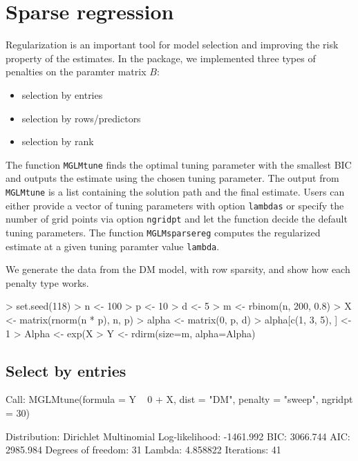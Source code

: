 \documentclass[a4paper]{article}
\begin{document}
\section{Sparse regression}

Regularization is an important tool for model selection and improving the risk property of the estimates.  In the package, we implemented three types of penalties on the paramter matrix $B$:
\begin{itemize}
\item selection by entries
\item selection by rows/predictors
\item selection by rank
\end{itemize}

The function {\tt MGLMtune} finds the optimal tuning parameter with the smallest BIC and outputs the estimate using the chosen tuning parameter.  The output from {\tt MGLMtune} is a list containing the solution path and the final estimate. Users can either provide a vector of tuning parameters with option {\tt lambdas} or specify the number of grid points via option {\tt ngridpt} and let the function decide the default tuning parameters. The function {\tt MGLMsparsereg} computes the regularized estimate at a given tuning paramter value {\tt lambda}.

We generate the data from the DM model, with row sparsity, and show how each penalty type works. 

\begin{Schunk}
\begin{Sinput}
> set.seed(118)
> n <- 100
> p <- 10
> d <- 5
> m <- rbinom(n, 200, 0.8)
> X <- matrix(rnorm(n * p), n, p)
> alpha <- matrix(0, p, d)
> alpha[c(1, 3, 5), ] <- 1
> Alpha <- exp(X %*% alpha)
> Y <- rdirm(size=m, alpha=Alpha)
\end{Sinput}
\end{Schunk}

\subsection{Select by entries}

\begin{Schunk}
\begin{Soutput}
Call: MGLMtune(formula = Y ~ 0 + X, dist = "DM", penalty = "sweep", 
    ngridpt = 30)

Distribution: Dirichlet Multinomial
Log-likelihood: -1461.992
BIC: 3066.744
AIC: 2985.984
Degrees of freedom: 31
Lambda: 4.858822
Iterations: 41
\end{Soutput}
\end{Schunk}
\end{document}
